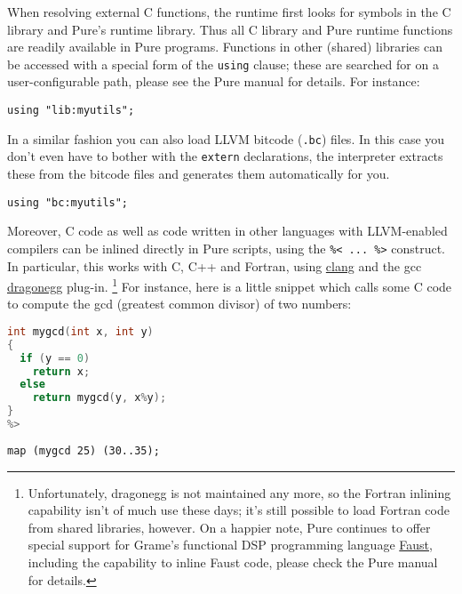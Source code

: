 \documentclass[a4paper,12pt]{article}
\begin{document}
When resolving external C functions, the runtime first looks for symbols in the C library and Pure's runtime library. Thus all C library and Pure runtime functions are readily available in Pure programs. Functions in other (shared) libraries can be accessed with a special form of the \lstinline{using} clause; these are searched for on a user-configurable path, please see the Pure manual for details. For instance:

\begin{lstlisting}
using "lib:myutils";
\end{lstlisting}

In a similar fashion you can also load LLVM bitcode (\texttt{.bc}) files. In this case you don't even have to bother with the \lstinline{extern} declarations, the interpreter extracts these from the bitcode files and generates them automatically for you.

\begin{lstlisting}
using "bc:myutils";
\end{lstlisting}

Moreover, C code as well as code written in other languages with LLVM-enabled compilers can be inlined directly in Pure scripts, using the \verb|%< ... %>| construct. In particular, this works with C, C++ and Fortran, using \href{http://clang.llvm.org}{clang} and the gcc \href{http://dragonegg.llvm.org}{dragonegg} plug-in.%
\footnote{Unfortunately, dragonegg is not maintained any more, so the Fortran inlining capability isn't of much use these days; it's still possible to load Fortran code from shared libraries, however. On a happier note, Pure continues to offer special support for Grame's functional DSP programming language \href{http://faust.grame.fr/}{Faust}, including the capability to inline Faust code, please check the Pure manual for details.} For instance, here is a little snippet which calls some C code to compute the gcd (greatest common divisor) of two numbers:

\begin{lstlisting}[language=C]
%<
int mygcd(int x, int y)
{
  if (y == 0)
    return x;
  else
    return mygcd(y, x%y);
}
%>
\end{lstlisting}

\begin{lstlisting}
map (mygcd 25) (30..35);
\end{lstlisting}
\end{document}
